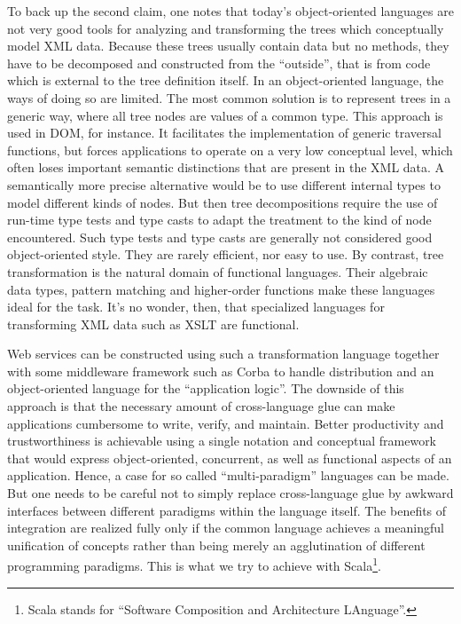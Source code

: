 To back up the second claim, one notes that today's object-oriented languages
are not very good tools for analyzing and transforming the trees which
conceptually model XML data. Because these trees usually contain data but no
methods, they have to be decomposed and constructed from the ``outside'', that is
from code which is external to the tree definition itself. In an
object-oriented language, the ways of doing so are limited. The most common
solution is to represent trees in a generic way, where all tree nodes are
values of a common type.  This approach is used in DOM, for instance. It
facilitates the implementation of generic traversal functions, but forces
applications to operate on a very low conceptual level, which often loses
important semantic distinctions that are present in the XML data. A
semantically more precise alternative would be to use different internal types
to model different kinds of nodes.  But then tree decompositions require the use
of run-time type tests and type casts to adapt the treatment to the kind of
node encountered. Such type tests and type casts are generally not considered
good object-oriented style. They are rarely efficient, nor easy to use.  By
contrast, tree transformation is the natural domain of functional
languages. Their algebraic data types, pattern matching and higher-order
functions make these languages ideal for the task. It's no wonder, then, that
specialized languages for transforming XML data such as XSLT are
functional.

Web services can be constructed using such a transformation language
together with some middleware framework such as Corba to handle
distribution and an object-oriented language for the ``application
logic''.  The downside of this approach is that the necessary amount
of cross-language glue can make applications cumbersome to write,
verify, and maintain.  Better productivity and trustworthiness is
achievable using a single notation and conceptual framework that would
express object-oriented, concurrent, as well as functional aspects of
an application.  Hence, a case for so called ``multi-paradigm''
languages can be made. But one needs to be careful not to simply
replace cross-language glue by awkward interfaces between different
paradigms within the language itself. The benefits of integration are
realized fully only if the common language achieves a meaningful
unification of concepts rather than being merely an agglutination of
different programming paradigms.  This is what we try to achieve with
Scala\footnote{Scala stands for ``Software Composition and
Architecture LAnguage''.}.


